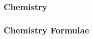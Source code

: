 \begin{frame}
\frametitle{Chemistry}
    
\end{frame}


\begin{frame}
\frametitle{Chemistry Formulae}
    
\end{frame}